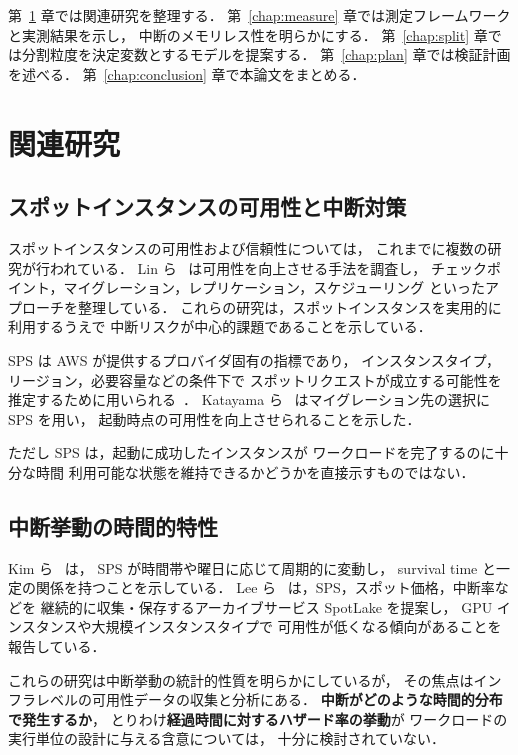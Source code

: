 \documentclass[11pt,a4paper]{ltjsreport}
\begin{document}
第~\ref{chap:related} 章では関連研究を整理する．
第~\ref{chap:measure} 章では測定フレームワークと実測結果を示し，
中断のメモリレス性を明らかにする．
第~\ref{chap:split} 章では分割粒度を決定変数とするモデルを提案する．
第~\ref{chap:plan} 章では検証計画を述べる．
第~\ref{chap:conclusion} 章で本論文をまとめる．

\chapter{関連研究}
\label{chap:related}

\section{スポットインスタンスの可用性と中断対策}

スポットインスタンスの可用性および信頼性については，
これまでに複数の研究が行われている．
Lin ら~\cite{Lin2022Survey} は可用性を向上させる手法を調査し，
チェックポイント，マイグレーション，レプリケーション，スケジューリング
といったアプローチを整理している．
これらの研究は，スポットインスタンスを実用的に利用するうえで
中断リスクが中心的課題であることを示している．

SPS は AWS が提供するプロバイダ固有の指標であり，
インスタンスタイプ，リージョン，必要容量などの条件下で
スポットリクエストが成立する可能性を推定するために用いられる~\cite{AWSSPS}．
Katayama ら~\cite{Katayama2022} はマイグレーション先の選択に SPS を用い，
起動時点の可用性を向上させられることを示した．

ただし SPS は，起動に成功したインスタンスが
ワークロードを完了するのに十分な時間
利用可能な状態を維持できるかどうかを直接示すものではない．

\section{中断挙動の時間的特性}

Kim ら~\cite{Kim2024SpotInterruption} は，
SPS が時間帯や曜日に応じて周期的に変動し，
survival time と一定の関係を持つことを示している．
Lee ら~\cite{Lee2022SpotLake} は，SPS，スポット価格，中断率などを
継続的に収集・保存するアーカイブサービス SpotLake を提案し，
GPU インスタンスや大規模インスタンスタイプで
可用性が低くなる傾向があることを報告している．

これらの研究は中断挙動の統計的性質を明らかにしているが，
その焦点はインフラレベルの可用性データの収集と分析にある．
\textbf{中断がどのような時間的分布で発生するか}，
とりわけ\textbf{経過時間に対するハザード率の挙動}が
ワークロードの実行単位の設計に与える含意については，
十分に検討されていない．
\end{document}
